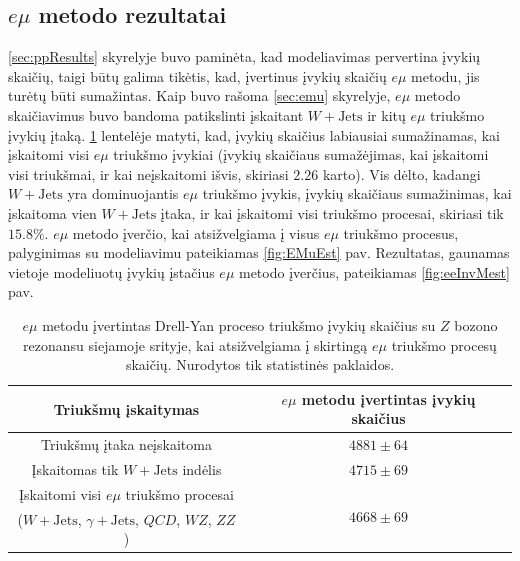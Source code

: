 \documentclass[a4paper, 12pt]{article}
\newcommand{\ZZ}{Z\! Z}
\newcommand{\WZ}{W\! Z}
\newcommand{\gJets}{\gamma\! +\!\mathrm{Jets}}
\newcommand{\WJets}{W\! +\!\mathrm{Jets}}
\newcommand{\QCD}{QC\! D}
\begin{document}
\subsection{$e\mu$ metodo rezultatai}

\ref{sec:ppResults} skyrelyje buvo paminėta, kad modeliavimas pervertina įvykių skaičių, taigi būtų galima tikėtis, kad, įvertinus įvykių skaičių $e\mu$ metodu, jis turėtų būti sumažintas. Kaip buvo rašoma \ref{sec:emu} skyrelyje, $e\mu$ metodo skaičiavimus buvo bandoma patikslinti įskaitant $\WJets$ ir kitų $e\mu$ triukšmo įvykių įtaką. \ref{table:emu} lentelėje matyti, kad, įvykių skaičius labiausiai sumažinamas, kai įskaitomi visi $e\mu$ triukšmo įvykiai (įvykių skaičiaus sumažėjimas, kai įskaitomi visi triukšmai, ir kai neįskaitomi išvis, skiriasi $2.26$ karto). Vis dėlto, kadangi $\WJets$ yra dominuojantis $e\mu$ triukšmo įvykis, įvykių skaičiaus sumažinimas, kai įskaitoma vien $\WJets$ įtaka, ir kai įskaitomi visi triukšmo procesai, skiriasi tik $15.8\%$. $e\mu$ metodo įverčio, kai atsižvelgiama į visus $e\mu$ triukšmo procesus, palyginimas su modeliavimu pateikiamas \ref{fig:EMuEst} pav. Rezultatas, gaunamas vietoje modeliuotų įvykių įstačius $e\mu$ metodo įverčius, pateikiamas \ref{fig:eeInvMest} pav.

\begin{centering}
\begin{table}[H]
\begin{tabular}{|c|c|}
\hline
Triukšmų įskaitymas & $e\mu$ metodu įvertintas įvykių skaičius \\
\hline \hline
Triukšmų įtaka neįskaitoma & $4881\pm 64$ \\
\hline
Įskaitomas tik $\WJets$ indėlis & $4715\pm 69$ \\
\hline
Įskaitomi visi $e\mu$ triukšmo procesai & \multirow{2}{5em}{\centering $4668\pm 69$} \\
($\WJets$, $\gJets$, $\QCD$, $\WZ$, $\ZZ$) & \\
\hline
\end{tabular}
\vspace{-0.2cm}
\caption{\label{table:emu} $e\mu$ metodu įvertintas Drell-Yan proceso triukšmo įvykių skaičius su $Z$ bozono rezonansu siejamoje srityje, kai atsižvelgiama į skirtingą $e\mu$ triukšmo procesų skaičių. Nurodytos tik statistinės paklaidos.}
\end{table}
\end{centering}
\end{document}
